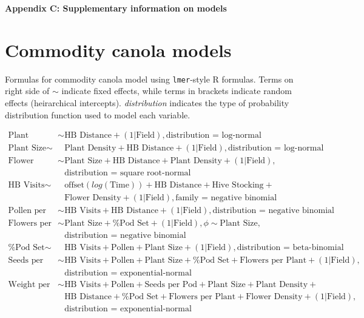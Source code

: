 \pagebreak
\begin{center}
\textbf{\large Appendix C: Supplementary information on models}
\end{center}

\section*{Commodity canola models}

Formulas for commodity canola model using \texttt{lmer}-style R formulas. Terms on right side of $\sim$ indicate fixed effects, while terms in brackets indicate random effects (heirarchical intercepts). \textit{distribution} indicates the type of probability distribution function used to model each variable.

\begin{align*}
    \text{Plant Density} \sim & \text{HB Distance} + (1|\text{Field}), \text{distribution = log-normal} \\
    \text{Plant Size} \sim & \text{Plant Density} + \text{HB Distance} + (1|\text{Field}),\text{distribution = log-normal} \\
    \text{Flower Density} \sim & \text{Plant Size} + \text{HB Distance} + \text{Plant Density} + (1|\text{Field}),\\
    &   \text{distribution = square root-normal} \\
    \text{HB Visits} \sim & \text{offset}(log(\text{Time})) + \text{HB Distance} + \text{Hive Stocking} + \\ 
    &   \text{Flower Density} + (1|\text{Field}), \text{family = negative binomial}\\
    \text{Pollen per Stigma} \sim & \text{HB Visits} + \text{HB Distance} + (1|\text{Field}), \text{distribution = negative binomial} \\
    \text{Flowers per Plant} \sim & \text{Plant Size} + \text{\% Pod Set} + (1|\text{Field}), \phi \sim \text{Plant Size}, \\
    &     \text{distribution = negative binomial} \\
    \text{\% Pod Set} \sim & \text{HB Visits} + \text{Pollen} + \text{Plant Size} + (1|\text{Field}), \text{distribution = beta-binomial} \\
    \text{Seeds per Pod} \sim & \text{HB Visits} + \text{Pollen} + \text{Plant Size} + \text{\% Pod Set} + \text{Flowers per Plant} + (1|\text{Field}),\\ 
    &   \text{distribution = exponential-normal} \\
    \text{Weight per Seed} \sim & \text{HB Visits} + \text{Pollen} + \text{Seeds per Pod} + \text{Plant Size} + \text{Plant Density} +\\
    &   \text{HB Distance} + \text{\% Pod Set} + \text{Flowers per Plant} + \text{Flower Density} + (1|\text{Field}),\\
    &   \text{distribution = exponential-normal} \\
\end{align*}

